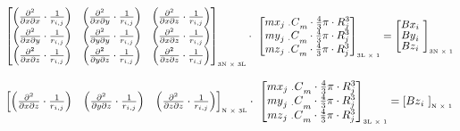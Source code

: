 \begin{equation} \label{eq:sphere5}
\small \left[\begin{matrix}\left(\frac{\partial^2}{\partial x\partial x}\cdot\frac{1}{r_{i,j}}\right)&\left(\frac{\partial^2}{\partial x\partial y}\cdot\frac{1}{r_{i,j}}\right)&\left(\frac{\partial^2}{\partial x\partial z}\cdot\frac{1}{r_{i,j}}\right)\\\left(\frac{\partial^2}{\partial x\partial y}\cdot\frac{1}{r_{i,j}}\right)&\left(\frac{\partial^2}{\partial y\partial y}\cdot\frac{1}{r_{i,j}}\right)&\left(\frac{\partial^2}{\partial x\partial z}\cdot\frac{1}{r_{i,j}}\right)\\\left(\frac{\partial^2}{\partial x\partial z}\cdot\frac{1}{r_{i,j}}\right)&\left(\frac{\partial^2}{\partial y\partial z}\cdot\frac{1}{r_{i,j}}\right)&\left(\frac{\partial^2}{\partial z\partial z}\cdot\frac{1}{r_{i,j}}\right)\\\end{matrix}\right]_{\text{\tiny 3N $\times$ 3L}}\cdot\ \left[\begin{matrix}{{mx}_{j\ \cdot}C}_m\cdot\frac{4}{3}\pi\cdot R_j^3\\{{my}_{j\ \cdot}C}_m\cdot\frac{4}{3}\pi\cdot R_j^3\\{{mz}_{j\ \cdot}C}_m\cdot\frac{4}{3}\pi\cdot R_j^3\\\end{matrix}\right]_{\text{\tiny 3L $\times$ 1}}=\left[\begin{matrix}{Bx}_{i\ }\\{By}_{i\ }\\{Bz}_{i\ }\\\end{matrix}\right]_{\text{\tiny 3N $\times$ 1}}
\end{equation}


\begin{equation} \label{eq:sphere6}
\small \left[\begin{matrix}\left(\frac{\partial^2}{\partial x\partial z}\cdot\frac{1}{r_{i,j}}\right)&\left(\frac{\partial^2}{\partial y\partial z}\cdot\frac{1}{r_{i,j}}\right)&\left(\frac{\partial^2}{\partial z\partial z}\cdot\frac{1}{r_{i,j}}\right)\\\end{matrix}\right]_{\text{\tiny N $\times$ 3L}}\cdot\ \left[\begin{matrix}{{mx}_{j\ \cdot}C}_m\cdot\frac{4}{3}\pi\cdot R_j^3\\{{my}_{j\ \cdot}C}_m\cdot\frac{4}{3}\pi\cdot R_j^3\\{{mz}_{j\ \cdot}C}_m\cdot\frac{4}{3}\pi\cdot R_j^3\\\end{matrix}\right]_{\text{\tiny 3L $\times$ 1}}=\left[{Bz}_{i\ }\right]_{\text{\tiny N $\times$ 1}}
\end{equation}

